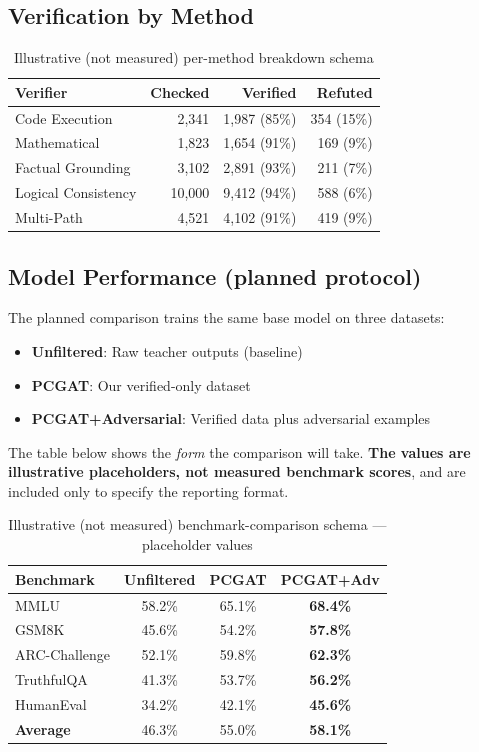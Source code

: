 \documentclass[11pt,a4paper]{article}
\begin{document}
\subsection{Verification by Method}

\begin{table}[h]
\centering
\caption{Illustrative (not measured) per-method breakdown schema}
\label{tab:methods}
\begin{tabular}{lrrr}
\toprule
\textbf{Verifier} & \textbf{Checked} & \textbf{Verified} & \textbf{Refuted} \\
\midrule
Code Execution & 2,341 & 1,987 (85\%) & 354 (15\%) \\
Mathematical & 1,823 & 1,654 (91\%) & 169 (9\%) \\
Factual Grounding & 3,102 & 2,891 (93\%) & 211 (7\%) \\
Logical Consistency & 10,000 & 9,412 (94\%) & 588 (6\%) \\
Multi-Path & 4,521 & 4,102 (91\%) & 419 (9\%) \\
\bottomrule
\end{tabular}
\end{table}

\subsection{Model Performance (planned protocol)}

The planned comparison trains the same base model on three datasets:
\begin{itemize}
    \item \textbf{Unfiltered}: Raw teacher outputs (baseline)
    \item \textbf{PCGAT}: Our verified-only dataset
    \item \textbf{PCGAT+Adversarial}: Verified data plus adversarial examples
\end{itemize}

The table below shows the \emph{form} the comparison will take. \textbf{The values are illustrative placeholders, not measured benchmark scores}, and are included only to specify the reporting format.

\begin{table}[h]
\centering
\caption{Illustrative (not measured) benchmark-comparison schema --- placeholder values}
\label{tab:benchmarks}
\begin{tabular}{lccc}
\toprule
\textbf{Benchmark} & \textbf{Unfiltered} & \textbf{PCGAT} & \textbf{PCGAT+Adv} \\
\midrule
MMLU & 58.2\% & 65.1\% & \textbf{68.4\%} \\
GSM8K & 45.6\% & 54.2\% & \textbf{57.8\%} \\
ARC-Challenge & 52.1\% & 59.8\% & \textbf{62.3\%} \\
TruthfulQA & 41.3\% & 53.7\% & \textbf{56.2\%} \\
HumanEval & 34.2\% & 42.1\% & \textbf{45.6\%} \\
\midrule
\textbf{Average} & 46.3\% & 55.0\% & \textbf{58.1\%} \\
\bottomrule
\end{tabular}
\end{table}
\end{document}
